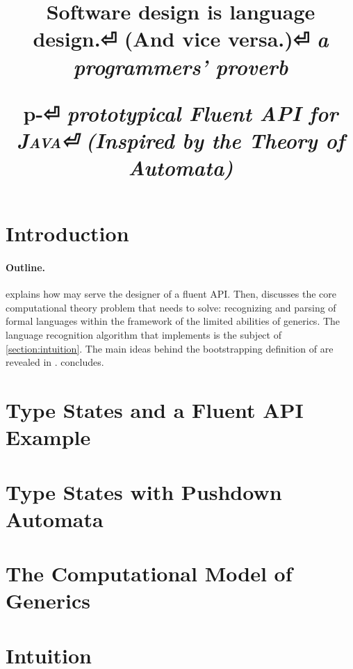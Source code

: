 \documentclass[nonatbib,preprint,numbers]{sigplanconf}
\title{%
\begin{flushright}
  \scriptsize\bfseries
  Software design is language design.⏎
    (And vice versa.)⏎
  \footnotesize\mdseries\itshape
   a programmers' proverb
\end{flushright}
  \Huge p-\Fajita⏎
  \huge \itshape \textbf prototypical \textbf Fluent \textbf API for \textsc{\textbf Java}⏎
  \LARGE (\textbf Inspired by the \textbf Theory of \textbf Automata)
}
\begin{document}
\maketitle

\begin{abstract}
  
\end{abstract}

\section{Introduction}


\paragraph{Outline.}

  explains how \Fajita may serve the designer of a fluent API\@.
Then,  discusses 
  the core computational theory problem that \Fajita
  needs to solve: recognizing and parsing of formal languages
  within the framework of the limited abilities of \Java
  generics.
The language recognition algorithm that \Fajita
  implements is the subject of \cref{section:intuition}.
The main ideas behind the bootstrapping definition of \Self
  are revealed in .
 concludes.

\section{Type States and a Fluent API Example}
\label{section:example}


\section{Type States with Pushdown Automata}
\label{section:generalization}


\section{The Computational Model of \protect\Java Generics}
\label{section:background}


\section{Intuition}
\label{section:recognizer}

\end{document}
